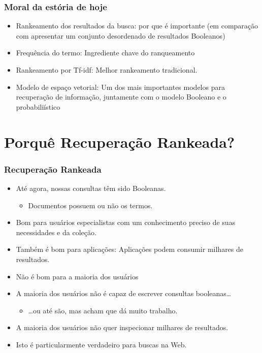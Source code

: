 \documentclass[compress]{beamer}
\def\myblue#1{\textcolor{texblue}{#1}}
\begin{document}
\begin{frame}[label=takeaway]
\frametitle{Moral da estória de hoje}

\begin{itemize}

\pause[2]

\item \myblue{Rankeamento} dos resultados da busca: por que é importante (em comparação com apresentar um conjunto desordenado de resultados Booleanos)

\pause[3]

\item \myblue{Frequência do termo:} Ingrediente chave do ranqueamento

\pause[4]

\item \myblue{Rankeamento por Tf-idf}: Melhor rankeamento tradicional.

\pause[5]

\item \myblue{Modelo de espaço vetorial}: Um dos mais importantes modelos para recuperação de informação, juntamente com o modelo Booleano e o probabiliístico

\end{itemize}

\end{frame}

\section{Porquê Recuperação Rankeada?}

\begin{frame}[<+->]
\frametitle{Recuperação Rankeada}
\pause[2]
\begin{itemize}
\item Até agora, nossas consultas têm sido \myblue{Booleanas}.
\begin{itemize}
\item Documentos possuem ou não os termos.
\end{itemize}
\item \myblue{Bom para usuários especialistas} com um conhecimento preciso de suas necessidades e da coleção.
\item Também é \myblue{bom para aplicações}: Aplicações podem consumir milhares de resultados.
\item \myblue{Não é bom para a maioria dos usuários}
\item A maioria dos usuários não é capaz de escrever consultas booleanas\ldots
\begin{itemize}
\item \ldots  ou até são, mas acham que dá muito trabalho.
\end{itemize}
\item A maioria dos usuários não quer inspecionar milhares de resultados. 
\item Isto é particularmente verdadeiro para buscas na Web.
\end{itemize}
\end{frame}
\end{document}
